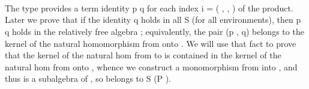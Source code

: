 \begin{itemize}
\begin{code}
\AgdaSymbol{\}}\AgdaSpace{}%
\AgdaSpace{}%
\AgdaSpace{}%
\<%
\\
%
\>[1]\AgdaSpace{}%
\AgdaSpace{}%
\AgdaSymbol{\{}\AgdaSymbol{\}\{}\AgdaSymbol{\}}\AgdaSpace{}%
\AgdaSymbol{=}\AgdaSpace{}%
\AgdaSpace{}%
\AgdaSpace{}%
\AgdaSpace{}%
\AgdaSpace{}%
\AgdaSpace{}%
\AgdaSpace{}%
\AgdaSpace{}%
\AgdaSpace{}%
\AgdaSpace{}%
\AgdaSpace{}%
\AgdaSpace{}%
\AgdaSpace{}%
\AgdaSpace{}%
\AgdaSpace{}%
\AgdaSpace{}%
\AgdaSpace{}%
\<%
\\
\>[1][@{}l@{\AgdaIndent{0}}]%
\>[2]\AgdaSpace{}%
\AgdaSpace{}%
\AgdaSpace{}%
\AgdaOperator{\AgdaFunction{𝔻[}}\AgdaSpace{}%
\AgdaSpace{}%
\AgdaSpace{}%
\AgdaOperator{\AgdaFunction{]}}\AgdaSpace{}%
\AgdaSpace{}%
\AgdaSymbol{(}\AgdaSpace{}%
\AgdaSpace{}%
\AgdaSymbol{)}\AgdaSpace{}%
\AgdaSymbol{;}\AgdaSpace{}%
\AgdaSpace{}%
\AgdaSpace{}%
\AgdaSymbol{(}\AgdaSpace{}%
\AgdaSymbol{)}\AgdaSpace{}%
\AgdaSpace{}%
\AgdaSymbol{(}\AgdaSpace{}%
\AgdaSpace{}%
\AgdaSymbol{)}\<%
\\
\>[0]\<%
\end{code}

The type  provides a term identity \ab p  \ab q for each index \ab i = ( ,  , ) of the product.
Later we prove that if the identity   \ab q holds in all   \af S  (for all environments), then \ab p  \ab q
holds in the relatively free algebra ; equivalently, the pair (\ab p , \ab q) belongs to the
kernel of the natural homomorphism from  onto . We will use that fact to prove
that the kernel of the natural hom from  to  is contained in the kernel of the natural hom from  onto ,
whence we construct a monomorphism from  into , and thus  is a subalgebra of ,
so belongs to \af S (\af P ).


\end{itemize}

